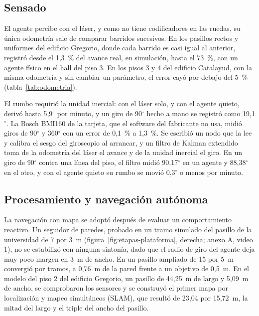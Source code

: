 \subsection{Sensado}
\label{sec:odometria-laser}
\label{sec:imu}

El agente percibe con el láser, y como no tiene codificadores en las ruedas, su única odometría sale de comparar barridos sucesivos. En los pasillos rectos y uniformes del edificio Gregorio, donde cada barrido es casi igual al anterior, registró desde el 1,3~\% del avance real, en simulación, hasta el 73~\%, con un agente físico en el hall del piso 3. En los pisos 3 y 4 del edificio Catalayud, con la misma odometría y sin cambiar un parámetro, el error cayó por debajo del 5~\% (tabla~\ref{tab:odometria}).

El rumbo requirió la unidad inercial: con el láser solo, y con el agente quieto, derivó hasta 5,9$^\circ$ por minuto, y un giro de 90$^\circ$ hecho a mano se registró como 19,1$^\circ$. La Bosch BMI160 de la tarjeta, que el software del fabricante no usa, midió giros de 90$^\circ$ y 360$^\circ$ con un error de 0,1~\% a 1,3~\%. Se escribió un nodo que la lee y calibra el sesgo del giroscopio al arrancar, y un filtro de Kalman extendido toma de la odometría del láser el avance y de la unidad inercial el giro. En un giro de 90$^\circ$ contra una línea del piso, el filtro midió 90,17$^\circ$ en un agente y 88,38$^\circ$ en el otro, y con el agente quieto su rumbo se movió 0,3$^\circ$ o menos por minuto.

\subsection{Procesamiento y navegación autónoma}
\label{sec:primeros-entornos}
\label{sec:nav2-ackermann}

La navegación con mapa se adoptó después de evaluar un comportamiento reactivo. Un seguidor de paredes, probado en un tramo simulado del pasillo de la universidad de 7 por 3~m (figura~\ref{fig:etapas-plataforma}, derecha; anexo A, video 1), no se estabilizó con ninguna sintonía, dado que el radio de giro del agente deja muy poco margen en 3~m de ancho. En un pasillo ampliado de 15 por 5~m convergió por tramos, a 0,76~m de la pared frente a un objetivo de 0,5~m. En el modelo del piso 2 del edificio Gregorio, un pasillo de 44,25~m de largo y 5,09~m de ancho, se comprobaron los sensores y se construyó el primer mapa por localización y mapeo simultáneos (SLAM), que resultó de 23,04 por 15,72~m, la mitad del largo y el triple del ancho del pasillo.

